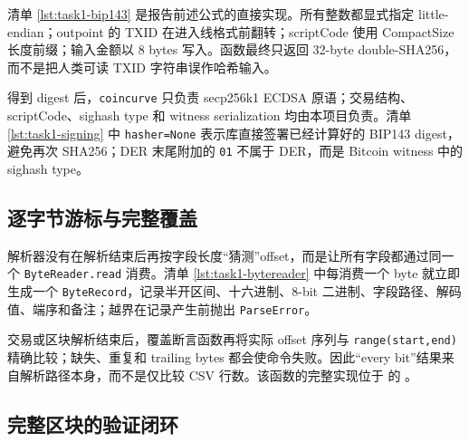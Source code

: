 \documentclass[11pt,a4paper,fontset=none]{ctexart}
\begin{document}
清单 \ref{lst:task1-bip143} 是报告前述公式的直接实现。所有整数都显式指定 little-endian；outpoint 的 TXID 在进入线格式前翻转；scriptCode 使用 CompactSize 长度前缀；输入金额以 8 bytes 写入。函数最终只返回 32-byte double-SHA256，而不是把人类可读 TXID 字符串误作哈希输入。



得到 digest 后，\texttt{coincurve} 只负责 secp256k1 ECDSA 原语；交易结构、scriptCode、sighash type 和 witness serialization 均由本项目负责。清单 \ref{lst:task1-signing} 中 \texttt{hasher=None} 表示库直接签署已经计算好的 BIP143 digest，避免再次 SHA256；DER 末尾附加的 \texttt{01} 不属于 DER，而是 Bitcoin witness 中的 sighash type。



\subsection{逐字节游标与完整覆盖}

解析器没有在解析结束后再按字段长度“猜测”offset，而是让所有字段都通过同一个 \texttt{ByteReader.read} 消费。清单 \ref{lst:task1-bytereader} 中每消费一个 byte 就立即生成一个 \texttt{ByteRecord}，记录半开区间、十六进制、8-bit 二进制、字段路径、解码值、端序和备注；越界在记录产生前抛出 \texttt{ParseError}。



交易或区块解析结束后，覆盖断言函数再将实际 offset 序列与 \texttt{range(start,end)} 精确比较；缺失、重复和 trailing bytes 都会使命令失败。因此“every bit”结果来自解析路径本身，而不是仅比较 CSV 行数。该函数的完整实现位于  的 。

\subsection{完整区块的验证闭环}
\end{document}
